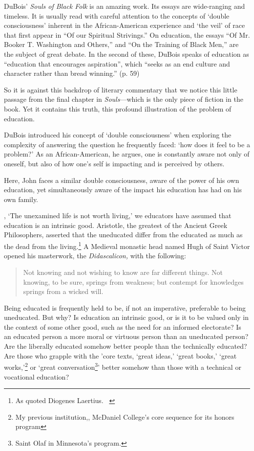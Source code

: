 DuBois' \emph{Souls of Black Folk} is an amazing work. Its essays are wide-ranging and timeless. It is usually read with careful attention to the concepts of `double consciousness' inherent in the African-American experience and `the veil' of race that first appear in ``Of our Spiritual Strivings.'' On education, the essays ``Of Mr. Booker T. Washington and Others,'' and ``On the Training of Black Men,'' are the subject of great debate. In the second of these, DuBois speaks of education as ``education that encourages aspiration'', which ``seeks as an end culture and character rather than bread winning.'' (p. 59) 

So it is against this backdrop of literary commentary that we notice this little passage from the final chapter in \emph{Souls}---which is the only piece of fiction in the book. Yet it contains this truth, this profound illustration of the problem of education.

DuBois introduced his concept of `double consciousness' when exploring the complexity of answering the question he frequently faced: `how does it feel to be a problem?' As an African-American, he argues, one is constantly aware not only of oneself, but also of how one's self is impacting and is perceived by others.

Here, John faces a similar double consciousness, aware of the power of his own education, yet simultaneously aware of the impact his education has had on his own family.

, `The unexamined life is not worth living,' we educators have assumed that education is an intrinsic good. Aristotle, the greatest of the Ancient Greek Philosophers, asserted that the uneducated differ from the educated as much as the dead from the living.\footnote{As quoted Diogenes Laertius. ~\citep[p. 463]{Laertius:eqeg5o3J}} A Medieval monastic head named Hugh of Saint Victor opened his masterwork, the \emph{Didascalicon,} with the following:

\begin{quote}

Not knowing and not wishing to know are far different things. Not knowing, to be sure, springs from weakness; but contempt for knowledges springs from a wicked will.
\end{quote}

Being educated is frequently held to be, if not an imperative, preferable to being uneducated. But why? Is education an intrinsic good, or is it to be valued only in the context of some other good, such as the need for an informed electorate? Is an educated person a more moral or virtuous person than an uneducated person? Are the liberally educated somehow better people than the technically educated? Are those who grapple with the 'core texts, `great ideas,' `great books,' `great works,'\footnote{My previous institution,, McDaniel College's core sequence for its honors program} or `great conversation\footnote{Saint Olaf in Minnesota's program.}' better somehow than those with a technical or vocational education?

